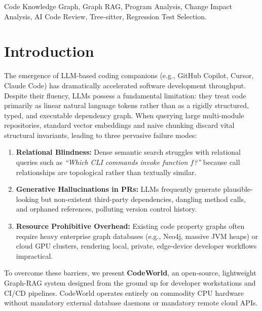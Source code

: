 \documentclass[conference]{IEEEtran}
\begin{document}
\begin{IEEEkeywords}
Code Knowledge Graph, Graph RAG, Program Analysis, Change Impact Analysis, AI Code Review, Tree-sitter, Regression Test Selection.
\end{IEEEkeywords}

\section{Introduction}
\label{sec:intro}
The emergence of LLM-based coding companions (e.g., GitHub Copilot, Cursor, Claude Code) has dramatically accelerated software development throughput. Despite their fluency, LLMs possess a fundamental limitation: they treat code primarily as linear natural language tokens rather than as a rigidly structured, typed, and executable dependency graph. When querying large multi-module repositories, standard vector embeddings and naive chunking discard vital structural invariants, leading to three pervasive failure modes:
\begin{enumerate}
    \item \textbf{Relational Blindness:} Dense semantic search struggles with relational queries such as \textit{``Which CLI commands invoke function $f$?''} because call relationships are topological rather than textually similar.
    \item \textbf{Generative Hallucinations in PRs:} LLMs frequently generate plausible-looking but non-existent third-party dependencies, dangling method calls, and orphaned references, polluting version control history.
    \item \textbf{Resource Prohibitive Overhead:} Existing code property graphs often require heavy enterprise graph databases (e.g., Neo4j, massive JVM heaps) or cloud GPU clusters, rendering local, private, edge-device developer workflows impractical.
\end{enumerate}

To overcome these barriers, we present \textbf{CodeWorld}, an open-source, lightweight Graph-RAG system designed from the ground up for developer workstations and CI/CD pipelines. CodeWorld operates entirely on commodity CPU hardware without mandatory external database daemons or mandatory remote cloud APIs.
\end{document}
